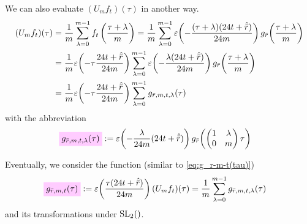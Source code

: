 \documentclass{article}
\begin{document}
We can also evaluate $(U_mf_t)(\tau)$ in another way.
%
\begin{align*}
  (U_mf_t)(\tau)
  &=
  \frac{1}{m} \sum_{\lambda=0}^{m-1}f_t\left(\frac{\tau+\lambda}{m}\right)
    =
    \frac{1}{m} \sum_{\lambda=0}^{m-1}
    \varepsilon\!\left(-\frac{(\tau+\lambda) (24 t + \hat{\bar{r}})}{24 m}\right)
    g_{\bar{r}}\!\left(\frac{\tau+\lambda}{m}\right)
  \\
  &=
  \frac{1}{m}
  \varepsilon\!\left(-\tau\frac{24t+\hat{\bar{r}}}{24m}\right)
  \sum_{\lambda=0}^{m-1}
  \varepsilon\!\left(-\frac{\lambda (24t+\hat{\bar{r}})}{24m}\right)
  g_{\bar{r}}\!\left(\frac{\tau+\lambda}{m}\right)
  \\
  &=
  \frac{1}{m}
  \varepsilon\!\left(-\tau\frac{24t+\hat{\bar{r}}}{24m}\right)
  \sum_{\lambda=0}^{m-1} g_{\bar{r},m,t,\lambda}(\tau)
\end{align*}
with the abbreviation
\begin{align}
  \defineNotation[g-rbar-m-t-lambda-tau]{g_{\bar{r},m,t,\lambda}(\tau)}
  &:=
    \unityPower{-\frac{\lambda}{24m} (24t+\sumdelta{\bar{r}})}
    g_{\bar{r}}
      \!\left(
      \begin{pmatrix}
        1 & \lambda\\
        0 & m
      \end{pmatrix}
            \tau
      \right)
  \label{eq:g_rbar-m-t-lambda(tau)}
\end{align}

Eventually, we consider the function (similar to
\eqref{eq:g_r-m-t(tau)})
\begin{align}
  \defineNotation[g-rbar-m-t-tau]{g_{\bar{r},m,t}(\tau)}
  &:= \unityPower{\frac{\tau (24t+\sumdelta{\bar{r}})}{24m} } (U_mf_t)(\tau)
  =
  \frac{1}{m} \sum_{\lambda=0}^{m-1} g_{\bar{r},m,t,\lambda}(\tau)
  \label{eq:g_rbar-m-t(tau)}
\end{align}
and its transformations under $\SL2Z$.
\end{document}
